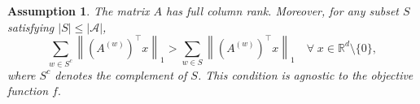 \documentclass{article}
\newtheorem{remark}[theorem]{Remark}
\newtheorem{assumption}{Assumption}
\newcommand{\norm}[1]{\left\lVert #1 \right\rVert}
\newcommand{\rsign}{R-SIGN\xspace}
\newcommand{\bI}{\mathbb{I}}
\newcommand{\cW}{\mathcal{W}}
\begin{document}
\begin{assumption}
    The matrix $A$ has full column rank. Moreover, for any subset $S$  satisfying $|S| \leq |\mathcal{A}|$, 
    \begin{equation*}
        \sum\limits_{w \in S^c} \norm{ ({A^{(w)}})^\top x}_1 > \sum\limits_{w \in S} \norm{ (A^{(w)})^\top x}_1 \quad \forall \; x \in \mathbb{R}^d\setminus\{0\},
    \end{equation*}
    where $S^c$ denotes the complement of $S$. This condition is agnostic to the objective function $f.$
    \label{fawzi-condn}
\end{assumption}



\end{document}
